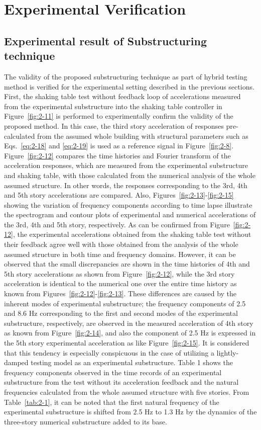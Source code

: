 \section{Experimental Verification}
\subsection{Experimental result of Substructuring technique}

The validity of the proposed substructuring technique as part of hybrid testing method is verified for the experimental setting described in the previous sections. First, the shaking table test without feedback loop of accelerations measured from the experimental substructure into the shaking table controller in Figure~\ref{fig:2-11} is performed to experimentally confirm the validity of the proposed method. In this case, the third story acceleration of responses pre-calculated from the assumed whole building with structural parameters such as Eqs.~\eqref{eq:2-18} and \eqref{eq:2-19} is used as a reference signal in Figure~\ref{fig:2-8}. Figure~\ref{fig:2-12} compares the time histories and Fourier transform of the acceleration responses, which are measured from the experimental substructure and shaking table, with those calculated from the numerical analysis of the whole assumed structure. In other words, the responses corresponding to the 3rd, 4th and 5th story accelerations are compared. Also, Figures~\ref{fig:2-13}-\ref{fig:2-15} showing the variation of frequency components according to time lapse illustrate the spectrogram and contour plots of experimental and numerical accelerations of the 3rd, 4th and 5th story, respectively. As can be confirmed from Figure~\ref{fig:2-12}, the experimental accelerations obtained from the shaking table test without their feedback agree well with those obtained from the analysis of the whole assumed structure in both time and frequency domains. However, it can be observed that the small discrepancies are shown in the time histories of 4th and 5th story accelerations as shown from Figure~\ref{fig:2-12}, while the 3rd story acceleration is identical to the numerical one over the entire time history as known from Figures~\ref{fig:2-12}-\ref{fig:2-13}. These differences are caused by the inherent modes of experimental substructure; the frequency components of 2.5 and 8.6 Hz corresponding to the first and second modes of the experimental substructure, respectively, are observed in the measured acceleration of 4th story as known from Figure~\ref{fig:2-14}, and also the component of 2.5 Hz is expressed in the 5th story experimental acceleration as like Figure~\ref{fig:2-15}. It is considered that this tendency is especially conspicuous in the case of utilizing a lightly-damped testing model as an experimental substructure. Table 1 shows the frequency components observed in the time records of an experimental substructure from the test without its acceleration feedback and the natural frequencies calculated from the whole assumed structure with five stories. From Table~\ref{tab:2-1}, it can be noted that the first natural frequency of the experimental substructure is shifted from 2.5 Hz to 1.3 Hz by the dynamics of the three-story numerical substructure added to its base.
